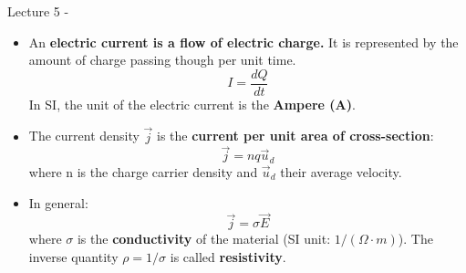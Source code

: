 
\renewcommand{\summarizedlecture}{5 }

%
%
%

\begin{frame}{Lecture \summarizedlecture - \lecturesummarytitle}

\begin{itemize}

\item
An {\bf electric current is a flow of electric charge.}
It is represented by the amount of charge passing though per unit time.
\begin{equation*}
  I = \frac{dQ}{dt}
\end{equation*}
In SI, the unit of the electric current is the {\bf Ampere (A)}.

\item
The  current density $\vec{j}$ is the {\bf current per unit area  of cross-section}:
\begin{equation*}
  \vec{j} = n q \vec{u}_{d}
\end{equation*}
where n is the charge carrier density and $\vec{u}_{d}$ their average velocity.

\item
In general:
\begin{equation*}
  \vec{j} = \sigma \vec{E}
\end{equation*}
where $\sigma$ is the {\bf conductivity} of the material (SI unit: $1/(\Omega \cdot m)$).
The inverse quantity $\rho = 1/\sigma$ is called {\bf resistivity}.

\end{itemize}

\end{frame}

